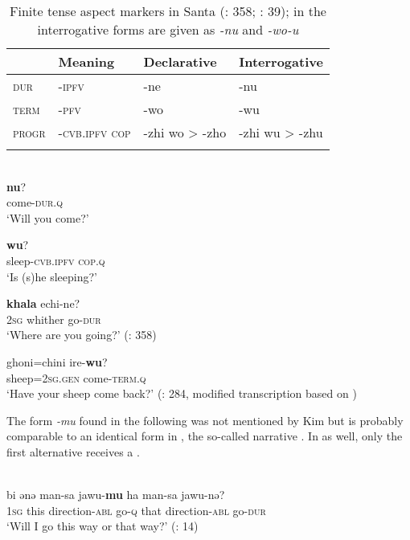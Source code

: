 \begin{table}
\caption{Finite tense aspect markers in Santa (\citealt{Kim2003}: 358; \citealt{Napoli2014}: 39); in \citet{Chaolu1994b} the interrogative forms are given as \textit{-nu} and \textit{-wo-u}}
\label{tab:mong:7}

\begin{tabularx}{\textwidth}{XXXl}
\lsptoprule
& \textbf{Meaning} & \textbf{Declarative} & \textbf{Interrogative}\\
\midrule
\textsc{dur} & \textsc{-ipfv} & -ne & -nu\\
\textsc{term} & \textsc{-pfv} & -wo & -wu\\
\textsc{progr} & -\textsc{cvb}.\textsc{ipfv cop} & -zhi wo > -zho & -zhi wu > -zhu\\
\lspbottomrule
\end{tabularx}
\end{table}

\ea%
    \label{ex:mong:47}
    \\
    \ea
    \textbf{{nu}}?\\
    come-\textsc{dur.q}\\
    \glt ‘Will you come?’
    
    \ex
     \textbf{{wu}}?\\
    sleep-\textsc{cvb}.\textsc{ipfv}  \textsc{cop}.\textsc{q}\\
    \glt ‘Is (s)he sleeping?’
    
    \ex
     \textbf{{khala}} {echi-ne?}\\
    2\textsc{sg}  whither  go-\textsc{dur}\\
    \glt ‘Where are you going?’ (\citealt{Kim2003}: 358)
    
    \ex
    \gll ghoni=chini    ire-\textbf{{wu}}?\\
    sheep=2\textsc{sg}.\textsc{gen}  come-\textsc{term}.\textsc{q}\\
    \glt ‘Have your sheep come back?’ (\citealt{Todaeva1959}: 284, modified transcription based on \citealt{Kim2003})\z\z

The form \textit{-mu} found in the following   was not mentioned by Kim but is probably comparable to an identical form in , the so-called narrative . In  as well, only the first alternative receives a .

\ea%
    \label{ex:mong:48}
    \\
    \gll bi  ənə {man-sa} {jawu-}\textbf{{mu}} {ha} {man-sa} {jawu-nə?}\\
    1\textsc{sg}  this  direction-\textsc{abl}  go-\textsc{q}    that  direction-\textsc{abl}  go-\textsc{dur}\\
    \glt ‘Will I go this way or that way?’ (\citealt{Chaolu1994b}: 14)
    \z


